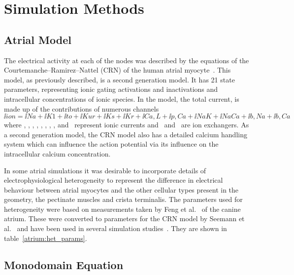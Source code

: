 \section{Simulation Methods}
\label{atrium:sec:model}

\subsection{Atrial Model}

The electrical activity at each of the nodes was described by the equations of
the Courtemanche--Ramirez--Nattel (CRN) of the human atrial
myocyte~\cite{crn98}.  This model, as previously described, is a second
generation model. It has 21 state parameters, representing ionic gating activations
and inactivations and intracellular concentrations of ionic species.  In the
model, the total current,  is made up of the contributions of numerous
channels
\begin{equation}
\label{atrium:crn}
\ii{ion} = \ii{Na} + \ii{K1} + \ii{to} + \ii{Kur} + \ii{Ks} + \ii{Kr} +
\ii{Ca,L} + \ii{p,Ca} + \ii{NaK} + \ii{NaCa} + \ii{b,Na} + \ii{b,Ca}
\end{equation}
where , , , , , , ,
,  and \ represent ionic currents and \ and
\ are ion exchangers.  As a second generation model, the CRN model also
has a detailed calcium handling system which can influence the action potential
via its influence on the intracellular calcium concentration.

In some atrial simulations it was desirable to incorporate details of
electrophysiological heterogeneity to represent the difference in electrical
behaviour between atrial myocytes and the other cellular types present in the
geometry, the pectinate muscles and crista terminalis.  The parameters used for
heterogeneity were based on measurements taken by Feng et al.~\cite{feng1998}
of the canine atrium.  These were converted to parameters for the CRN model by
Seemann et al.~\cite{Seemann2004} and have been used in several simulation
studies~\cite{Seemann2006,Stott2008}.  They are shown in
table~\ref{atrium:het_params}.

\subsection{Monodomain Equation}

